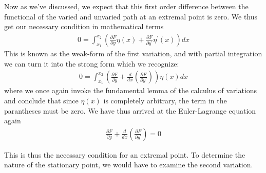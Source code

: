 \documentclass[a4paper]{article}
\begin{document}
    Now as we've discussed, we expect that this first order difference between the functional of the varied and unvaried path at an extremal point is zero. We thus get our necessary condition in mathematical terms \begin{align*}
        0 = \int_{x_1}^{x_2} \left( \frac{\partial F}{\partial y} \eta(x) + \frac{\partial F}{\partial y^{\prime} }\eta^{\prime}(x)\right) dx
    \end{align*}
    This is known as the weak-form of the first variation, and with partial integration we can turn it into the strong form which we recognize:
    \begin{align*}
        0 = \int_{x_1}^{x_2} \left( \frac{\partial F}{\partial y} + \frac{d}{dx} \left(\frac{\partial F}{\partial y^{\prime} } \right)\right)\eta(x) dx
    \end{align*}
    where we once again invoke the fundamental lemma of the calculus of variations and conclude that since \(\eta(x)\) is completely arbitrary, the term in the parantheses must be zero. We have thus arrived at the Euler-Lagrange equation again \begin{align*}
        \frac{\partial F}{\partial y} + \frac{d}{dx} \left(\frac{\partial F}{\partial y^{\prime} } \right) = 0
    \end{align*}

    This is thus the necessary condition for an extremal point. To determine the nature of the stationary point, we would have to examine the second variation.
\end{document}
